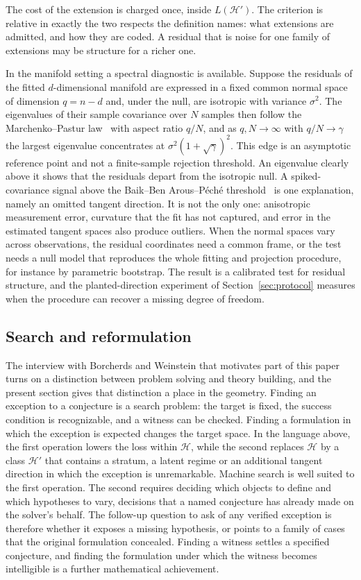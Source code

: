\documentclass[11pt,a4paper]{article}
\theoremstyle{definition}
\theoremstyle{remark}
\begin{document}
The cost of the extension is charged once, inside $L(\mathcal{H}')$. The
criterion is relative in exactly the two respects the definition names: what
extensions are admitted, and how they are coded. A residual that is noise
for one family of extensions may be structure for a richer one.

In the manifold setting a spectral diagnostic is available. Suppose the
residuals of the fitted $d$-dimensional manifold are expressed in a fixed
common normal space of dimension $q=n-d$ and, under the null, are isotropic
with variance $\sigma^2$. The eigenvalues of their sample covariance over $N$
samples then follow the Marchenko--Pastur law~\cite{marchenko1967distribution}
with aspect ratio $q/N$, and as $q,N\to\infty$ with $q/N\to\gamma$ the largest
eigenvalue concentrates at $\sigma^2(1+\sqrt\gamma)^2$. This edge is an
asymptotic reference point and not a finite-sample rejection threshold. An
eigenvalue clearly above it shows that the residuals depart from the isotropic
null. A spiked-covariance signal above the Baik--Ben Arous--P\'ech\'e
threshold~\cite{baik2005phase} is one explanation, namely an omitted tangent
direction. It is not the only one: anisotropic measurement error, curvature
that the fit has not captured, and error in the estimated tangent spaces also
produce outliers. When the normal spaces vary across observations, the
residual coordinates need a common frame, or the test needs a null model that
reproduces the whole fitting and projection procedure, for instance by
parametric bootstrap. The result is a calibrated test for residual structure,
and the planted-direction experiment of Section~\ref{sec:protocol} measures
when the procedure can recover a missing degree of freedom.

\subsection{Search and reformulation}

The interview with Borcherds and Weinstein that motivates part of this
paper~\cite{borcherds2026conversation} turns on a distinction between
problem solving and theory building, and the present section gives that
distinction a place in the geometry. Finding an exception to a conjecture
is a search problem: the target is fixed, the success condition is
recognizable, and a witness can be checked. Finding a formulation in which
the exception is expected changes the target space. In the language above,
the first operation lowers the loss within $\mathcal{H}$, while the
second replaces $\mathcal{H}$ by a class $\mathcal{H}'$ that contains a
stratum, a latent regime or an additional tangent direction in which the
exception is unremarkable. Machine search is well suited to the first
operation. The second requires deciding which objects to define and which
hypotheses to vary, decisions that a named conjecture has already made on
the solver's behalf. The follow-up question to ask of any verified exception is therefore whether it exposes a missing hypothesis, or points to a family of cases that the original formulation concealed. Finding a witness settles a specified conjecture, and finding the formulation under which the witness becomes intelligible is a further mathematical achievement.
\end{document}
